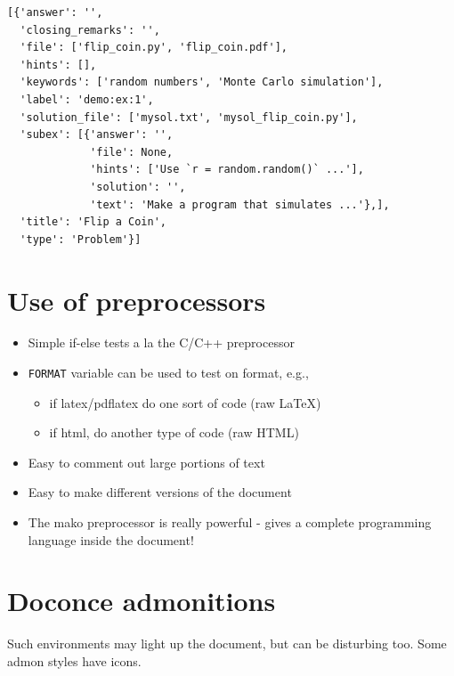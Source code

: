 \documentclass[%
twoside,                 %
final,                   %
chapterprefix=true,      %
open=right               %
10pt]{book}
\newenvironment{graybox1admon}[1][]{
\begin{graybox1mdframed}[frametitle=#1]
}
{
\end{graybox1mdframed}
}
\begin{document}
\begin{Verbatim}[numbers=none,fontsize=\fontsize{9pt}{9pt},baselinestretch=0.95]
[{'answer': '',
  'closing_remarks': '',
  'file': ['flip_coin.py', 'flip_coin.pdf'],
  'hints': [],
  'keywords': ['random numbers', 'Monte Carlo simulation'],
  'label': 'demo:ex:1',
  'solution_file': ['mysol.txt', 'mysol_flip_coin.py'],
  'subex': [{'answer': '',
             'file': None,
             'hints': ['Use `r = random.random()` ...'],
             'solution': '',
             'text': 'Make a program that simulates ...'},],
  'title': 'Flip a Coin',
  'type': 'Problem'}]
\end{Verbatim}

\section*{Use of preprocessors}

\begin{itemize}
 \item Simple if-else tests a la the C/C++ preprocessor

 \item \Verb!FORMAT! variable can be used to test on format, e.g.,
\begin{itemize}

    \item if latex/pdflatex do one sort of code (raw {\LaTeX})

    \item if html, do another type of code (raw HTML)

\end{itemize}

\noindent
 \item Easy to comment out large portions of text

 \item Easy to make different versions of the document

 \item The mako preprocessor is really powerful - gives a
   complete programming language inside the document!
\end{itemize}

\noindent
\section*{Doconce admonitions}


\begin{graybox1admon}[Use with caution!]
Such environments may light up the document, but can be disturbing too.
Some admon styles have icons.
\end{graybox1admon}
\end{document}

